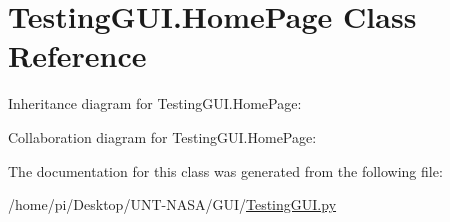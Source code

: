 \hypertarget{classTestingGUI_1_1HomePage}{}\section{Testing\+G\+U\+I.\+Home\+Page Class Reference}
\label{classTestingGUI_1_1HomePage}


Inheritance diagram for Testing\+G\+U\+I.\+Home\+Page\+:


Collaboration diagram for Testing\+G\+U\+I.\+Home\+Page\+:


The documentation for this class was generated from the following file\+:\begin{DoxyCompactItemize}
\item 
/home/pi/\+Desktop/\+U\+N\+T-\/\+N\+A\+S\+A/\+G\+U\+I/\hyperlink{GUI_2TestingGUI_8py}{Testing\+G\+U\+I.\+py}\end{DoxyCompactItemize}

